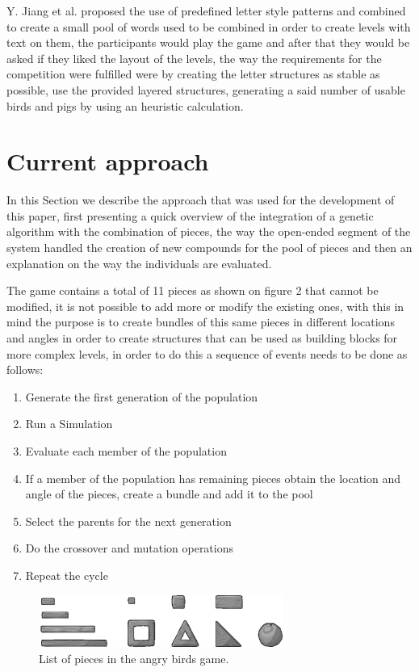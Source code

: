\documentclass[graybox]{svmult}
\begin{document}
Y. Jiang et al. \cite{Jiang2017} proposed the use of predefined letter style patterns and combined to create a small pool of words used to be combined in order to create levels with text on them, the participants would play the game and after that they would be asked if they liked the layout of the levels, the way the requirements for the competition were fulfilled were by creating the letter structures as stable as possible, use the provided layered structures, generating a said number of usable birds and pigs by using an heuristic calculation.

\section{Current approach}

In this Section we describe the approach that was used for the development of this paper, first presenting a quick overview of the integration of a genetic algorithm with the combination of pieces, the way the open-ended segment of the system handled the creation of new compounds for the pool of pieces and then an explanation on the way the individuals are evaluated.

The game contains a total of 11 pieces as shown on figure 2 that cannot be modified, it is not possible to add more or modify the existing ones, with this in mind the purpose is to create bundles of this same pieces in different locations and angles in order to create structures that can be used as building blocks for more complex levels, in order to do this a sequence of events needs to be done as follows:

\begin{enumerate}
\item Generate the first generation of the population
\item Run a Simulation
\item Evaluate each member of the population
\item If a member of the population has remaining pieces obtain the location and angle of the pieces, create a bundle and add it to the pool
\item Select the parents for the next generation
\item Do the crossover and mutation operations
\item Repeat the cycle
\end{enumerate}

\begin{figure}[htbp]
\centerline{\includegraphics[width=80mm]{Images/list_pieces.png}}
\caption{List of pieces in the angry birds game.}
\label{fig}
\end{figure}
\end{document}
